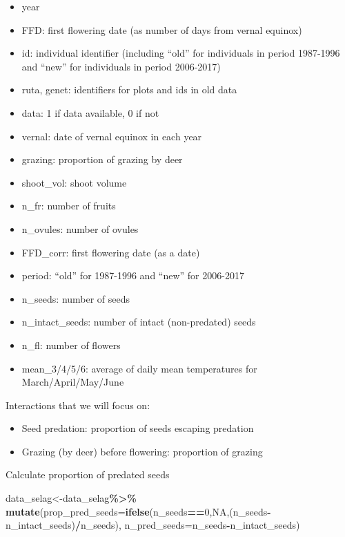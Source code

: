 \documentclass[
]{article}
\newenvironment{Shaded}{\begin{snugshade}}{\end{snugshade}}
\newcommand{\DataTypeTok}[1]{\textcolor[rgb]{0.13,0.29,0.53}{#1}}
\newcommand{\DecValTok}[1]{\textcolor[rgb]{0.00,0.00,0.81}{#1}}
\newcommand{\KeywordTok}[1]{\textcolor[rgb]{0.13,0.29,0.53}{\textbf{#1}}}
\newcommand{\NormalTok}[1]{#1}
\newcommand{\OperatorTok}[1]{\textcolor[rgb]{0.81,0.36,0.00}{\textbf{#1}}}
\newcommand{\OtherTok}[1]{\textcolor[rgb]{0.56,0.35,0.01}{#1}}
\newcommand{\StringTok}[1]{\textcolor[rgb]{0.31,0.60,0.02}{#1}}
\providecommand{\tightlist}{%
  \setlength{\itemsep}{0pt}\setlength{\parskip}{0pt}}
\begin{document}
\begin{itemize}
\tightlist
\item
  year
\item
  FFD: first flowering date (as number of days from vernal equinox)
\item
  id: individual identifier (including ``old'' for individuals in period
  1987-1996 and ``new'' for individuals in period 2006-2017)
\item
  ruta, genet: identifiers for plots and ids in old data
\item
  data: 1 if data available, 0 if not
\item
  vernal: date of vernal equinox in each year
\item
  grazing: proportion of grazing by deer
\item
  shoot\_vol: shoot volume
\item
  n\_fr: number of fruits
\item
  n\_ovules: number of ovules
\item
  FFD\_corr: first flowering date (as a date)
\item
  period: ``old'' for 1987-1996 and ``new'' for 2006-2017
\item
  n\_seeds: number of seeds
\item
  n\_intact\_seeds: number of intact (non-predated) seeds
\item
  n\_fl: number of flowers
\item
  mean\_3/4/5/6: average of daily mean temperatures for
  March/April/May/June
\end{itemize}

Interactions that we will focus on:

\begin{itemize}
\tightlist
\item
  Seed predation: proportion of seeds escaping predation
\item
  Grazing (by deer) before flowering: proportion of grazing
\end{itemize}

Calculate proportion of predated seeds

\begin{Shaded}
\begin{Highlighting}[]
\NormalTok{data\_selag\textless{}{-}data\_selag}\OperatorTok{\%\textgreater{}\%}
\StringTok{  }\KeywordTok{mutate}\NormalTok{(}\DataTypeTok{prop\_pred\_seeds=}\KeywordTok{ifelse}\NormalTok{(n\_seeds}\OperatorTok{==}\DecValTok{0}\NormalTok{,}\OtherTok{NA}\NormalTok{,(n\_seeds}\OperatorTok{{-}}\NormalTok{n\_intact\_seeds)}\OperatorTok{/}\NormalTok{n\_seeds),}
         \DataTypeTok{n\_pred\_seeds=}\NormalTok{n\_seeds}\OperatorTok{{-}}\NormalTok{n\_intact\_seeds)}
\end{Highlighting}
\end{Shaded}
\end{document}
